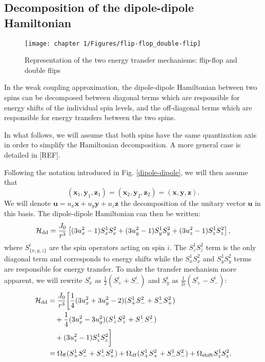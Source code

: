 \documentclass[a4paper, 11pt]{book}
\begin{document}
\subsection{Decomposition of the dipole-dipole Hamiltonian}

\begin{figure}[h!]
\centering
\texttt{[image: chapter 1/Figures/flip-flop\_double-flip]}
\caption{Representation of the two energy transfer mechanisms: flip-flop and double flips} 
\label{flip flop double flip}
\end{figure}

In the weak coupling approximation, the dipole-dipole Hamiltonian between two spins can be decomposed between diagonal terms which are responsible for energy shifts of the individual spin levels, and the off-diagonal terms which are responsible for energy transfers between the two spins.

In what follows, we will assume that both spins have the same quantization axis in order to simplify the Hamiltonian decomposition. A more general case is detailed in [REF].

Following the notation introduced in Fig. \ref{dipole-dipole}, we will then assume that $$(\mathbf{x}_1,\mathbf{y}_1,\mathbf{z}_1) = (\mathbf{x}_2,\mathbf{y}_2,\mathbf{z}_2) = (\mathbf{x},\mathbf{y},\mathbf{z}).$$ We will denote $\mathbf{u}=u_x \mathbf{x} + u_y \mathbf{y} + u_z \mathbf{z}$ the decomposition of the unitary vector $\mathbf{u}$ in this basis. The dipole-dipole Hamiltonian can then be written:
\begin{equation}
\mathcal{H}_{\rm dd}=\frac{J_0}{r^3}\left[ (3 u_x^2-1) S_x^1 S_x^2 + (3 u_y^2-1) S_y^1 S_y^2 + (3 u_z^2-1) S_z^1 S_z^2 \right],
\end{equation}
where $S_{\{x,y,z\} }^i$ are the spin operators acting on spin $i$. The $S_z^1 S_z^2$ term is the only diagonal term and corresponds to energy shifts while the $S_x^1 S_x^2$ and $S_y^1 S_y^2$ terms are responsible for energy transfer. To make the transfer mechanism more apparent, we will rewrite $S_x^i$ as $\frac{1}{2}(S_+^i+S_-^i)$ and $S_y^i$ as $\frac{1}{2i}(S_+^i-S_-^i)$:
\begin{align}
\mathcal{H}_{\rm dd}&=\frac{J_0}{r^3}\bigg{[} \frac{1}{4}(3 u_x^2 + 3 u_y^2 -2)(S_+^1 S_-^2 + S_-^1 S_+^2) \nonumber \\
&\quad + \frac{1}{4}(3 u_x^2 - 3 u_y^2)(S_+^1 S_+^2 + S_-^1 S_-^2) \nonumber \\
&\quad +(3 u_z^2-1) S_z^1 S_z^2 \bigg{]} \nonumber \\
\medskip
&= \Omega_{\rm ff} (S_+^1 S_-^2 + S_-^1 S_+^2) + \Omega_{\rm df} (S_+^1 S_+^2 + S_-^1 S_-^2) + \Omega_{\rm shift} S_z^1 S_z^2. \label{eq. ff df}
\end{align}
\end{document}
